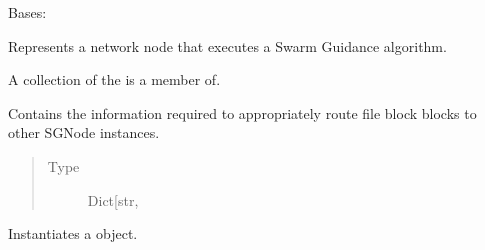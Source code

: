 \documentclass[letterpaper,10pt,english]{sphinxmanual}
\begin{document}

\begin{fulllineitems}
\label{\detokenize{app.domain:app.domain.network_nodes.SGNode}}
Bases: {\hyperref[\detokenize{app.domain:app.domain.network_nodes.Node}]{}}

Represents a network node that executes a Swarm Guidance algorithm.

\begin{fulllineitems}
\label{\detokenize{app.domain:app.domain.network_nodes.SGNode.clusters}}
A collection of {\hyperref[\detokenize{app.domain:app.domain.cluster_groups.SGCluster}]{}} the  is a
member of.

\end{fulllineitems}


\begin{fulllineitems}
\label{\detokenize{app.domain:app.domain.network_nodes.SGNode.routing_table}}
Contains the information required to appropriately route file
block blocks to other SGNode instances.
\begin{quote}\begin{description}
\item[{Type}] \leavevmode
Dict{[}str, \sphinxhref{https://pandas.pydata.org/docs/reference/api/pandas.DataFrame.html\#pandas.DataFrame}{\sphinxcode{\sphinxupquote{DataFrame}}}{]}

\end{description}\end{quote}

\end{fulllineitems}


\begin{fulllineitems}
\label{\detokenize{app.domain:app.domain.network_nodes.SGNode.__init__}}
Instantiates a  object.


\end{fulllineitems}
\end{fulllineitems}
\end{document}
